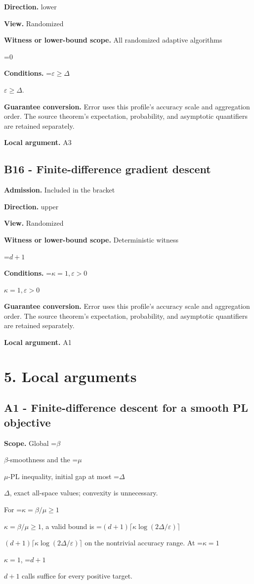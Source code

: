 \documentclass[10pt,a4paper]{article}
\newcommand{\AtlasMath}[1]{\par\begingroup\centering\setbox0=\hbox{$\displaystyle #1$}\ifdim\wd0>1.4\linewidth\typeout{ATLAS WIDE FORMULA: \the\wd0}\fi\ifdim\wd0>\linewidth\resizebox{\linewidth}{!}{\box0}\else\box0\fi\par\endgroup}
\newcommand{\AtlasInlineMath}[1]{\begingroup\setbox0=\hbox{$#1$}\ifdim\wd0>.4\linewidth\endgroup\AtlasMath{#1}\else\endgroup$#1$\fi}
\begin{document}
\textbf{Direction.} lower

\textbf{View.} Randomized

\textbf{Witness or lower-bound scope.} All randomized adaptive algorithms

\AtlasMath{0}
\textbf{Conditions.} \AtlasInlineMath{\varepsilon\ge\Delta}.

\textbf{Guarantee conversion.} Error uses this profile's accuracy scale and aggregation order. The source theorem's expectation, probability, and asymptotic quantifiers are retained separately.

\textbf{Local argument.} A3

\subsection{B16 - Finite-difference gradient descent}
\textbf{Admission.} Included in the bracket

\textbf{Direction.} upper

\textbf{View.} Randomized

\textbf{Witness or lower-bound scope.} Deterministic witness

\AtlasMath{d+1}
\textbf{Conditions.} \AtlasInlineMath{\kappa=1,\varepsilon>0}

\textbf{Guarantee conversion.} Error uses this profile's accuracy scale and aggregation order. The source theorem's expectation, probability, and asymptotic quantifiers are retained separately.

\textbf{Local argument.} A1

\section{5. Local arguments}
\subsection{A1 - Finite-difference descent for a smooth PL objective}
\textbf{Scope.} Global \AtlasInlineMath{\beta}-smoothness and the \AtlasInlineMath{\mu}-PL inequality, initial gap at most \AtlasInlineMath{\Delta}, exact all-space values; convexity is unnecessary.

For \AtlasInlineMath{\kappa=\beta/\mu\ge1}, a valid bound is \AtlasInlineMath{(d+1)\lceil\kappa\log(2\Delta/\varepsilon)\rceil} on the nontrivial accuracy range. At \AtlasInlineMath{\kappa=1}, \AtlasInlineMath{d+1} calls suffice for every positive target.
\end{document}

